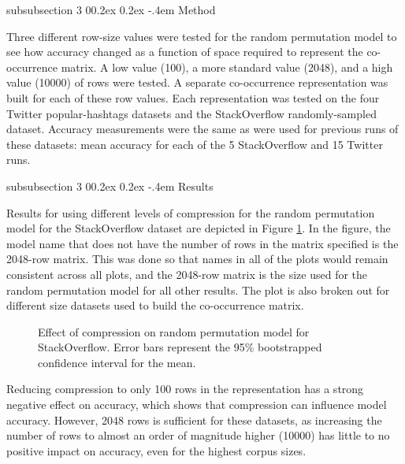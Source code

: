 \documentclass[man,floatsintext,donotrepeattitle]{apa6}
\makeatletter
\renewcommand{\subsubsection}{%
  \@startsection
  {subsubsection}%
  {3}%
  {\parindent}%
  {0\baselineskip \@plus 0.2ex \@minus 0.2ex}%
  {-.4em}%
  {\normalfont\normalsize\bfseries\addperi}}
\makeatother
\begin{document}
\subsubsection{Method}

Three different row-size values were tested for the random permutation model to see how accuracy changed as a function of space required to represent the co-occurrence matrix.
A low value (\num{100}), a more standard value (\num{2048}), and a high value (\num{10000}) of rows were tested.
A separate co-occurrence representation was built for each of these row values.
Each representation was tested on the four Twitter popular-hashtags datasets and the StackOverflow randomly-sampled dataset.
Accuracy measurements were the same as were used for previous runs of these datasets: mean accuracy for each of the 5 StackOverflow and 15 Twitter runs.

\subsubsection{Results}

Results for using different levels of compression for the random permutation model for the StackOverflow dataset are depicted in Figure \ref{figContextDimSO}.
In the figure, the model name that does not have the number of rows in the matrix specified is the \num{2048}-row matrix.
This was done so that names in all of the plots would remain consistent across all plots, and the \num{2048}-row matrix is the size used for the random permutation model for all other results.
The plot is also broken out for different size datasets used to build the co-occurrence matrix.

\begin{figure}[!htbp]
  \caption{
    Effect of compression on random permutation model for StackOverflow.
    Error bars represent the 95\% bootstrapped confidence interval for the mean.
  }
  \label{figContextDimSO}
\end{figure}

Reducing compression to only 100 rows in the representation has a strong negative effect on accuracy, which shows that compression can influence model accuracy.
However, \num{2048} rows is sufficient for these datasets, as increasing the number of rows to almost an order of magnitude higher (\num{10000}) has little to no positive impact on accuracy, even for the highest corpus sizes.
\end{document}
